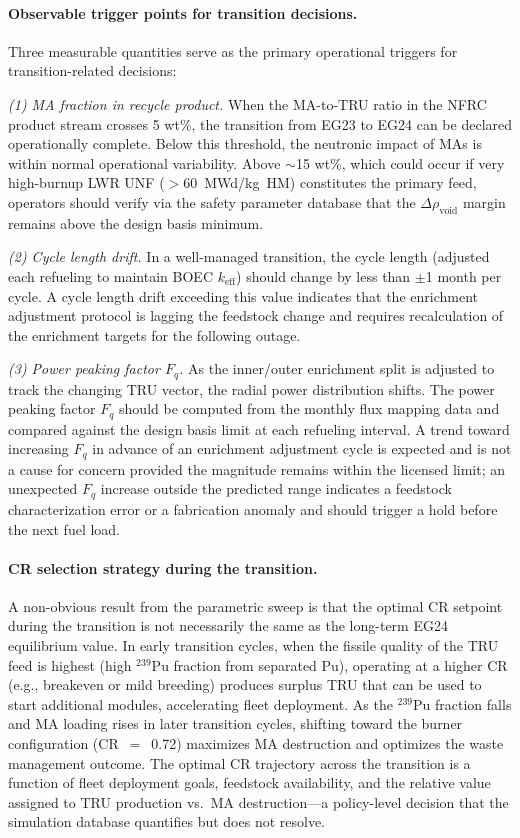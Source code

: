 \documentclass[10pt,twoside]{article}
\begin{document}
\paragraph{Observable trigger points for transition decisions.}
Three measurable quantities serve as the primary operational
triggers for transition-related decisions:

\textit{(1) MA fraction in recycle product.}
When the MA-to-TRU ratio in the NFRC product stream crosses
5 wt\%, the transition from EG23 to EG24 can be declared
operationally complete.  Below this threshold, the
neutronic impact of MAs is within normal operational
variability.  Above $\sim$15 wt\%, which could occur if
very high-burnup LWR UNF ($>$60~MWd/kg~HM) constitutes
the primary feed, operators should verify via the
safety parameter database that the $\Delta\rho_\text{void}$
margin remains above the design basis minimum.

\textit{(2) Cycle length drift.}
In a well-managed transition, the cycle length (adjusted
each refueling to maintain BOEC $k_\text{eff}$) should
change by less than $\pm$1 month per cycle.  A cycle
length drift exceeding this value indicates that the
enrichment adjustment protocol is lagging the feedstock
change and requires recalculation of the enrichment
targets for the following outage.

\textit{(3) Power peaking factor $F_q$.}
As the inner/outer enrichment split is adjusted to track
the changing TRU vector, the radial power distribution
shifts.  The power peaking factor $F_q$ should be computed
from the monthly flux mapping data and compared against the
design basis limit at each refueling interval.  A trend
toward increasing $F_q$ in advance of an enrichment
adjustment cycle is expected and is not a cause for concern
provided the magnitude remains within the licensed limit;
an unexpected $F_q$ increase outside the predicted range
indicates a feedstock characterization error or a
fabrication anomaly and should trigger a hold before
the next fuel load.

\paragraph{CR selection strategy during the transition.}
A non-obvious result from the parametric sweep is that the
optimal CR setpoint during the transition is not necessarily
the same as the long-term EG24 equilibrium value.  In early
transition cycles, when the fissile quality of the TRU feed
is highest (high $^{239}$Pu fraction from separated Pu),
operating at a higher CR (e.g., breakeven or mild breeding)
produces surplus TRU that can be used to start additional
modules, accelerating fleet deployment.  As the $^{239}$Pu
fraction falls and MA loading rises in later transition cycles,
shifting toward the burner configuration (CR~$=$~0.72)
maximizes MA destruction and optimizes the waste management
outcome.  The optimal CR trajectory across the transition
is a function of fleet deployment goals, feedstock availability,
and the relative value assigned to TRU production vs.\
MA destruction---a policy-level decision that the simulation
database quantifies but does not resolve.
\end{document}
